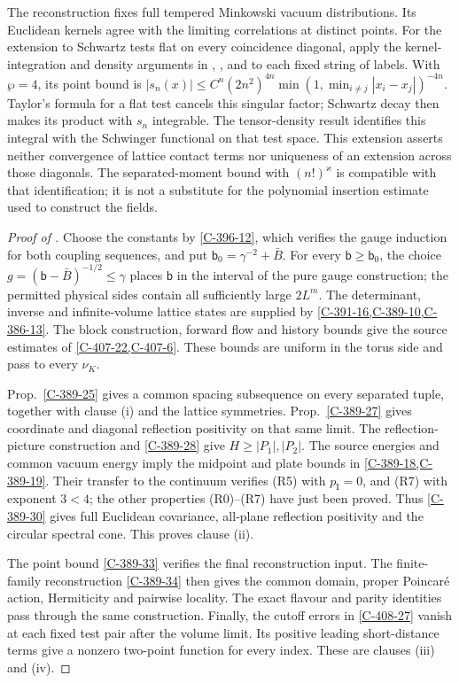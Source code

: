 \documentclass[11pt,letterpaper,reqno]{amsart}
\theoremstyle{definition}
\theoremstyle{remark}
\begin{document}
The reconstruction fixes full tempered Minkowski
vacuum distributions. Its Euclidean kernels agree with
the limiting correlations at distinct points. For the extension to Schwartz tests flat on every
coincidence diagonal, apply the kernel-integration and density
arguments in \cite[Lem.~8.44]{YMM1}, \cite[Lem.~8.45]{YMM1}, and
\cite[Prop.~8.46]{YMM1} to each fixed string of labels. With $\wp=4$, its point bound is
$|s_n(x)|\le C^n(2n^2)^{4n}
\min(1,\min_{i\ne j}|x_i-x_j|)^{-4n}$.
Taylor's formula for a flat test cancels this singular factor;
Schwartz decay then makes its product with $s_n$ integrable.
The tensor-density result identifies this integral with the
Schwinger functional on that test space. This extension
asserts neither convergence of lattice contact terms
nor uniqueness of an extension across those diagonals.
The separated-moment bound with $(n!)^\varkappa$ is
compatible with that identification; it is not a
substitute for the polynomial insertion estimate used
to construct the fields.

\begin{proof}[Proof of ]
Choose the constants by \cref{C-396-12}, which verifies
the gauge induction for both coupling sequences, and put
$\mathsf b_0=\gamma^{-2}+\bar B$. For every
$\mathsf b\ge\mathsf b_0$, the choice
$g=(\mathsf b-\bar B)^{-1/2}\le\gamma$ places
$\mathsf b$ in the interval of the pure gauge construction;
the permitted physical sides contain all sufficiently large
$2L^m$. The determinant, inverse and infinite-volume lattice
states are supplied by \cref{C-391-16,C-389-10,C-386-13}.
The block construction, forward flow and
history bounds give the source estimates of
\cref{C-407-22,C-407-6}. These bounds are uniform in the
torus side and pass to every $\nu_K$.

Prop.~\ref{C-389-25} gives a common spacing subsequence
on every separated tuple, together with clause \textup{(i)}
and the lattice symmetries. Prop.~\ref{C-389-27}
gives coordinate and diagonal reflection positivity on
that same limit. The reflection-picture construction and
\cref{C-389-28} give $H\ge|P_1|,|P_2|$.
The source energies and common vacuum energy imply the
midpoint and plate bounds in \cref{C-389-18,C-389-19}.
Their transfer to the continuum verifies (R5) with
$p_{\mathrm I}=0$, and (R7) with exponent $3<4$;
the other properties (R0)--(R7) have just been proved.
Thus \cref{C-389-30} gives full Euclidean covariance,
all-plane reflection positivity and the circular spectral
cone. This proves clause \textup{(ii)}.

The point bound \cref{C-389-33} verifies the final
reconstruction input. The finite-family reconstruction
\cref{C-389-34} then gives the common domain, proper
Poincar\'e action, Hermiticity and pairwise locality.
The exact flavour and parity identities pass through
the same construction. Finally, the cutoff errors in
\cref{C-408-27} vanish at each fixed test pair after
the volume limit. Its positive leading short-distance
terms give a nonzero two-point function for every index.
These are clauses \textup{(iii)} and \textup{(iv)}.
\end{proof}
\end{document}

